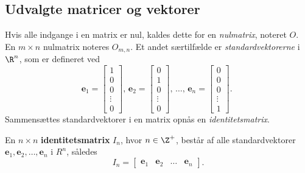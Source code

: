 \subsection{Udvalgte matricer og vektorer} 
% 
Hvis alle indgange i en matrix er nul, kaldes dette for en \textit{nulmatrix}, noteret $O$. 
En $m \times n$ nulmatrix noteres $O_{m,n}$.
%
Et andet særtilfælde er \textit{standardvektorerne} i $\R^n$, som er defineret ved  
$$
\textbf{e}_1=
\begin{bmatrix}
1 \\ 
0 \\
0 \\
\vdots \\
0
\end{bmatrix}
\text{, }
\textbf{e}_2=
\begin{bmatrix}
0 \\ 
1 \\
0 \\
\vdots \\
0
\end{bmatrix}
\text{, }
\ldots
\text{, }
\textbf{e}_n=
\begin{bmatrix}
0 \\ 
0 \\
0 \\
\vdots \\
1
\end{bmatrix}
\text{. }
$$
%
Sammensættes standardvektorer i en matrix opnås en \textit{identitetsmatrix}.
%
\begin{defn}{}{}
%
En $n \times n$ \textbf{identitetsmatrix} $I_n$, hvor $n \in \Z^+$, består af alle standardvektorer $\textbf{e}_1, \textbf{e}_2, \ldots, \textbf{e}_n$ i $R^n$, således 
$$
I_n=
\begin{bmatrix}
\textbf{e}_1 & \textbf{e}_2 & \ldots & \textbf{e}_n
\end{bmatrix}.
$$ 
\end{defn}
\noindent
%
